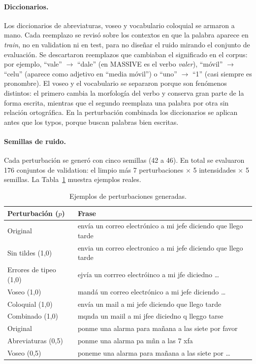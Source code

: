 \documentclass[11pt,a4paper]{article}
\begin{document}
\paragraph{Diccionarios.} Los diccionarios de abreviaturas, voseo y vocabulario coloquial se
armaron a mano. Cada reemplazo se revisó sobre los contextos en que la palabra aparece en
\emph{train}, no en validation ni en test, para no diseñar el ruido mirando el conjunto de
evaluación. Se descartaron reemplazos que cambiaban el significado en el corpus: por ejemplo,
\enquote{vale} $\to$ \enquote{dale} (en MASSIVE es el verbo \emph{valer}), \enquote{móvil}
$\to$ \enquote{celu} (aparece como adjetivo en \enquote{media móvil}) o \enquote{uno} $\to$
\enquote{1} (casi siempre es pronombre). El voseo y el vocabulario se separaron porque son
fenómenos distintos: el primero cambia la morfología del verbo y conserva gran parte de la
forma escrita, mientras que el segundo reemplaza una palabra por otra sin relación
ortográfica. En la perturbación combinada los diccionarios se aplican antes que los typos,
porque buscan palabras bien escritas.

\paragraph{Semillas de ruido.} Cada perturbación se generó con cinco semillas (42 a 46). En
total se evaluaron 176 conjuntos de validation: el limpio más 7 perturbaciones $\times$ 5
intensidades $\times$ 5 semillas. La Tabla~\ref{tab:ejemplos} muestra ejemplos reales.

\begin{table}[H]
\centering
\small
\begin{tabular}{@{}l l@{}}
\toprule
Perturbación ($p$) & Frase \\
\midrule
Original & envía un correo electrónico a mi jefe diciendo que llego tarde \\
Sin tildes (1,0) & envia un correo electronico a mi jefe diciendo que llego tarde \\
Errores de tipeo (1,0) & ejvía un corrreo electróinco a mi jfe diciedno \ldots \\
Voseo (1,0) & mandá un correo electrónico a mi jefe diciendo \ldots \\
Coloquial (1,0) & envía un mail a mi jefe diciendo que llego tarde \\
Combinado (1,0) & mqnda un maiil a mi jfee diciedno q lleggo tarse \\
\midrule
Original & ponme una alarma para mañana a las siete por favor \\
Abreviaturas (0,5) & ponme una alarma pa mñn a las 7 xfa \\
Voseo (0,5) & poneme una alarma para mañana a las siete por \ldots \\
\bottomrule
\end{tabular}
\caption{Ejemplos de perturbaciones generadas.}
\label{tab:ejemplos}
\end{table}
\end{document}
